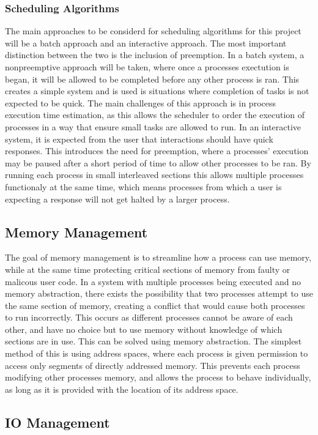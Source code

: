 \subsubsection{Scheduling Algorithms}
The main approaches to be considerd for scheduling algorithms for this project will be a batch approach and an interactive approach. The most important distinction between the two is the inclusion of preemption. In a batch system, a nonpreemptive approach will be taken, where once a processes exectution is began, it will be allowed to be completed before any other process is ran. This creates a simple system and is used is situations where completion of tasks is not expected to be quick. The main challenges of this approach is in process execution time estimation, as this allows the scheduler to order the execution of processes in a way that ensure small tasks are allowed to run. In an interactive system, it is expected from the user that interactions should have quick responses. This introduces the need for preemption, where a processes' execution may be paused after a short period of time to allow other processes to be ran. By running each process in small interleaved sections this allows multiple processes functionaly at the same time, which means processes from which a user is expecting a response will not get halted by a larger process.
\subsection{Memory Management}
The goal of memory management is to streamline how a process can use memory, while at the same time protecting critical sections of memory from faulty or malicous user code. In a system with multiple processes being executed and no memory abstraction, there exists the possibility that two processes attempt to use the same section of memory, creating a conflict that would cause both processes to run incorrectly. This occurs as different processes cannot be aware of each other, and have no choice but to use memory without knowledge of which sections are in use. This can be solved using memory abstraction. The simplest method of this is using address spaces, where each process is given permission to access only segments of directly addressed memory. This prevents each process modifying other processes memory, and allows the process to behave individually, as long as it is provided with the location of its address space.\cite{modern_operating}
\subsection{IO Management}
